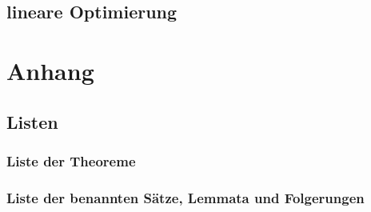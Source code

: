 \documentclass[ngerman,a4paper,order=firstname,sectionreset]{../../texmf/tex/latex/mathscript/mathscript}
\begin{document}
\chapter{lineare Optimierung}






\part*{Anhang}
\appendix

\chapter{Listen}
\section{Liste der Theoreme}

\pagebreak
\section{Liste der benannten Sätze, Lemmata und Folgerungen}


\printindex
\end{document}
